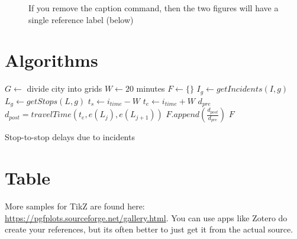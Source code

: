 \begin{figure}[!h]
    \begin{subfigure}{\columnwidth}
        \centering
    \end{subfigure}
    \hfill
    \begin{subfigure}{\columnwidth}
        \centering
    \end{subfigure}
    \caption{If you remove the caption command, then the two figures will have a single reference label (below)}
    \label{fig:amplitudeBC2}
\end{figure}

\blindtext

\section{Algorithms}

\blindtext

\begin{algorithm}[!htbp]
    \begin{algorithmic}[1]
    \State $G \gets$ divide city into grids
    \State $W \gets 20$ minutes 
    \State $F \gets \{\}$
     
        \State $I_g \gets getIncidents(I, g)$
        \State $L_g \gets getStops(L, g)$
            \State $t_s \gets i_{time} - W$
            \State $t_e \gets i_{time} + W$
            \State $d_{pre}$ 
            \State $d_{post} = travelTime(t_e, e(L_j), e(L_{j+1}))$
            \State $F.append(\frac{d_{post}}{d_{pre}})$ 
        \EndFor
    \EndFor
    \State \Return $F$
    \end{algorithmic}
    \caption{Stop-to-stop delays due to incidents}
    \label{algo:incident_factor}
\end{algorithm}

\section{Table}
\blindtext



More samples for TikZ are found here: \url{https://pgfplots.sourceforge.net/gallery.html}. You can use apps like Zotero do create your references, but its often better to just get it from the actual source.